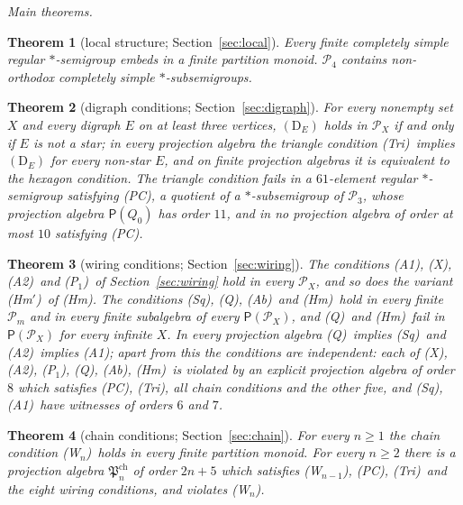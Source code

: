 \documentclass[11pt]{amsart}
\newtheorem{theorem}{Theorem}[section]
\theoremstyle{definition}
\renewcommand{\P}{\mathcal{P}}      %
\newcommand{\PA}{\mathsf{P}}         %
\newcommand{\Qone}{\textup{(PC)}}     %
\newcommand{\Tri}{\textup{(Tri)}}
\newcommand{\Wire}{\textup{(Sq)}}      %
\newcommand{\Rcond}{\textup{(A1)}}     %
\newcommand{\Rp}{\textup{(A2)}}        %
\newcommand{\Vcond}{\textup{(X)}}      %
\newcommand{\Pone}{\textup{(P$_1$)}}
\newcommand{\Qcond}{\textup{(Q)}}
\newcommand{\Kzero}{\textup{(Hm)}}     %
\newcommand{\Hmp}{\textup{(Hm$'$)}}     %
\newcommand{\Kfour}{\textup{(Ab)}}     %
\newcommand{\Wn}[1][n]{\textup{(W$_{#1}$)}}
\begin{document}
\medskip
\noindent\emph{Main theorems.}

\begin{theorem}[local structure; Section~\ref{sec:local}]\label{thm:main-cs}
Every finite completely simple regular $*$-semigroup embeds in a finite partition monoid. $\P_4$ contains non-orthodox completely simple $*$-subsemigroups.
\end{theorem}

\begin{theorem}[digraph conditions; Section~\ref{sec:digraph}]\label{thm:main-digraph}
For every nonempty set $X$ and every digraph $E$ on at least three vertices, $(\mathrm D_E)$ holds in $\P_X$ if and only if $E$ is not a star; in every projection algebra the triangle condition \Tri\ implies $(\mathrm D_E)$ for every non-star $E$, and on finite projection algebras it is equivalent to the hexagon condition. The triangle condition fails in a $61$-element regular $*$-semigroup satisfying \Qone, a quotient of a $*$-subsemigroup of $\P_3$, whose projection algebra $\PA(Q_0)$ has order $11$, and in no projection algebra of order at most $10$ satisfying \Qone.
\end{theorem}

\begin{theorem}[wiring conditions; Section~\ref{sec:wiring}]\label{thm:main-wiring}
The conditions \Rcond, \Vcond, \Rp\ and \Pone\ of Section~\ref{sec:wiring} hold in every $\P_X$, and so does the variant \Hmp\ of \Kzero. The conditions \Wire, \Qcond, \Kfour\ and \Kzero\ hold in every finite $\P_m$ and in every finite subalgebra of every $\PA(\P_X)$, and \Qcond\ and \Kzero\ fail in $\PA(\P_X)$ for every infinite $X$. In every projection algebra \Qcond\ implies \Wire\ and \Rp\ implies \Rcond; apart from this the conditions are independent: each of \Vcond, \Rp, \Pone, \Qcond, \Kfour, \Kzero\ is violated by an explicit projection algebra of order $8$ which satisfies \Qone, \Tri, all chain conditions and the other five, and \Wire, \Rcond\ have witnesses of orders $6$ and $7$.
\end{theorem}

\begin{theorem}[chain conditions; Section~\ref{sec:chain}]\label{thm:main-chain}
For every $n\ge1$ the chain condition \Wn\ holds in every finite partition monoid. For every $n\ge2$ there is a projection algebra $\mathfrak P^{\mathrm{ch}}_n$ of order $2n+5$ which satisfies \Wn[n-1], \Qone, \Tri\ and the eight wiring conditions, and violates \Wn.
\end{theorem}
\end{document}
